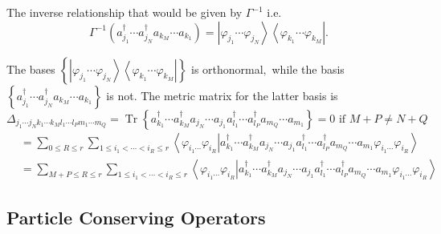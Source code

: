 \documentclass[aps,preprint]{revtex4}%
\begin{document}
The inverse relationship that would be given by $\Gamma^{-1}$ i.e.
\begin{equation}
\Gamma^{-1}\left(  a_{j_{1}}^{\dagger}\cdots a_{j_{N}}^{\dagger}a_{k_{M}%
}\cdots a_{k_{1}}\right)  =\left\vert \varphi_{j_{1}}\cdots\varphi_{j_{N}%
}\right\rangle \left\langle \varphi_{k_{1}}\cdots\varphi_{k_{M}}\right\vert .
\end{equation}


The bases $\left\{  \left\vert \varphi_{j_{1}}\cdots\varphi_{j_{N}%
}\right\rangle \left\langle \varphi_{k_{1}}\cdots\varphi_{k_{M}}\right\vert
\right\}  $ is orthonormal$,$ while the basis $\left\{  a_{j_{1}}^{\dagger
}\cdots a_{j_{N}}^{\dagger}a_{k_{M}}\cdots a_{k_{1}}\right\}  $ is not. The
metric matrix for the latter basis is
\begin{equation}
\Delta_{j_{1}\cdots j_{N}k_{1}\cdots k_{M}l_{1}\cdots l_{P}m_{1}\cdots m_{Q}%
}=\operatorname*{Tr}\left\{  a_{k_{1}}^{\dagger}\cdots a_{k_{M}}^{\dagger
}a_{j_{N}}\cdots a_{j_{1}}a_{l_{1}}^{\dagger}\cdots a_{l_{P}}^{\dagger
}a_{m_{Q}}\cdots a_{m_{1}}\right\}  =0\text{ if }M+P\neq N+Q
\end{equation}%
\begin{align}
&  =\sum_{0\leq R\leq r}\sum_{1\leq i_{1}<\cdots<i_{R}\leq r}\left\langle
\varphi_{i_{1}\cdots}\varphi_{i_{R}}\left\vert a_{k_{1}}^{\dagger}\cdots
a_{k_{M}}^{\dagger}a_{j_{N}}\cdots a_{j_{1}}a_{l_{1}}^{\dagger}\cdots
a_{l_{P}}^{\dagger}a_{m_{Q}}\cdots a_{m_{1}}\right.  \varphi_{i_{1}\cdots
}\varphi_{i_{R}}\right\rangle \\
&  =\sum_{M+P\leq R\leq r}\sum_{1\leq i_{1}<\cdots<i_{R}\leq r}\left\langle
\varphi_{i_{1}\cdots}\varphi_{i_{R}}\left\vert a_{k_{1}}^{\dagger}\cdots
a_{k_{M}}^{\dagger}a_{j_{N}}\cdots a_{j_{1}}a_{l_{1}}^{\dagger}\cdots
a_{l_{P}}^{\dagger}a_{m_{Q}}\cdots a_{m_{1}}\right.  \varphi_{i_{1}\cdots
}\varphi_{i_{R}}\right\rangle
\end{align}


\subsection{Particle Conserving Operators}
\end{document}
